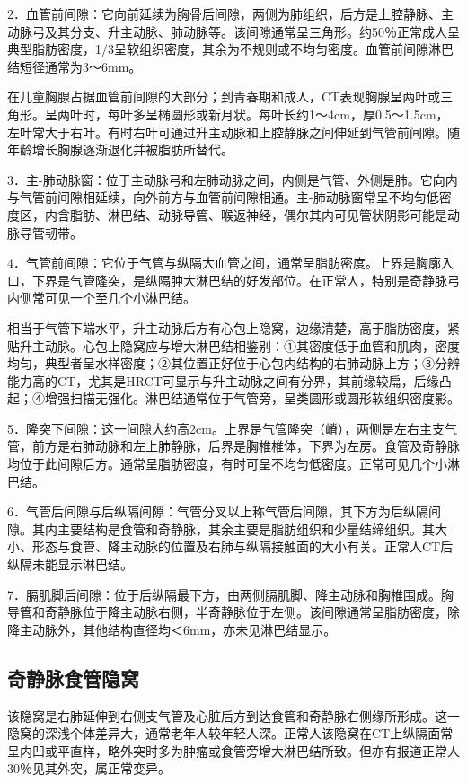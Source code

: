 2．血管前间隙：它向前延续为胸骨后间隙，两侧为肺组织，后方是上腔静脉、主动脉弓及其分支、升主动脉、肺动脉等。该间隙通常呈三角形。约50％正常成人呈典型脂肪密度，1/3呈软组织密度，其余为不规则或不均匀密度。血管前间隙淋巴结短径通常为3～6mm。

在儿童胸腺占据血管前间隙的大部分；到青春期和成人，CT表现胸腺呈两叶或三角形。呈两叶时，每叶多呈椭圆形或新月状。每叶长约1～4cm，厚0.5～1.5cm，左叶常大于右叶。有时右叶可通过升主动脉和上腔静脉之间伸延到气管前间隙。随年龄增长胸腺逐渐退化并被脂肪所替代。

3．主-肺动脉窗：位于主动脉弓和左肺动脉之间，内侧是气管、外侧是肺。它向内与气管前间隙相延续，向外前方与血管前间隙相通。主-肺动脉窗常呈不均匀低密度区，内含脂肪、淋巴结、动脉导管、喉返神经，偶尔其内可见管状阴影可能是动脉导管韧带。

4．气管前间隙：它位于气管与纵隔大血管之间，通常呈脂肪密度。上界是胸廓入口，下界是气管隆突，是纵隔肿大淋巴结的好发部位。在正常人，特别是奇静脉弓内侧常可见一个至几个小淋巴结。

相当于气管下端水平，升主动脉后方有心包上隐窝，边缘清楚，高于脂肪密度，紧贴升主动脉。心包上隐窝应与增大淋巴结相鉴别：①其密度低于血管和肌肉，密度均匀，典型者呈水样密度；②其位置正好位于心包内结构的右肺动脉上方；③分辨能力高的CT，尤其是HRCT可显示与升主动脉之间有分界，其前缘较扁，后缘凸起；④增强扫描无强化。淋巴结通常位于气管旁，呈类圆形或圆形软组织密度影。

5．隆突下间隙：这一间隙大约高2cm。上界是气管隆突（嵴），两侧是左右主支气管，前方是右肺动脉和左上肺静脉，后界是胸椎椎体，下界为左房。食管及奇静脉均位于此间隙后方。通常呈脂肪密度，有时可呈不均匀低密度。正常可见几个小淋巴结。

6．气管后间隙与后纵隔间隙：气管分叉以上称气管后间隙，其下方为后纵隔间隙。其内主要结构是食管和奇静脉，其余主要是脂肪组织和少量结缔组织。其大小、形态与食管、降主动脉的位置及右肺与纵隔接触面的大小有关。正常人CT后纵隔未能显示淋巴结。

7．膈肌脚后间隙：位于后纵隔最下方，由两侧膈肌脚、降主动脉和胸椎围成。胸导管和奇静脉位于降主动脉右侧，半奇静脉位于左侧。该间隙通常呈脂肪密度，除降主动脉外，其他结构直径均＜6mm，亦未见淋巴结显示。

\subsection{奇静脉食管隐窝}

该隐窝是右肺延伸到右侧支气管及心脏后方到达食管和奇静脉右侧缘所形成。这一隐窝的深浅个体差异大，通常老年人较年轻人深。正常人该隐窝在CT上纵隔面常呈内凹或平直样，略外突时多为肿瘤或食管旁增大淋巴结所致。但亦有报道正常人30％见其外突，属正常变异。

